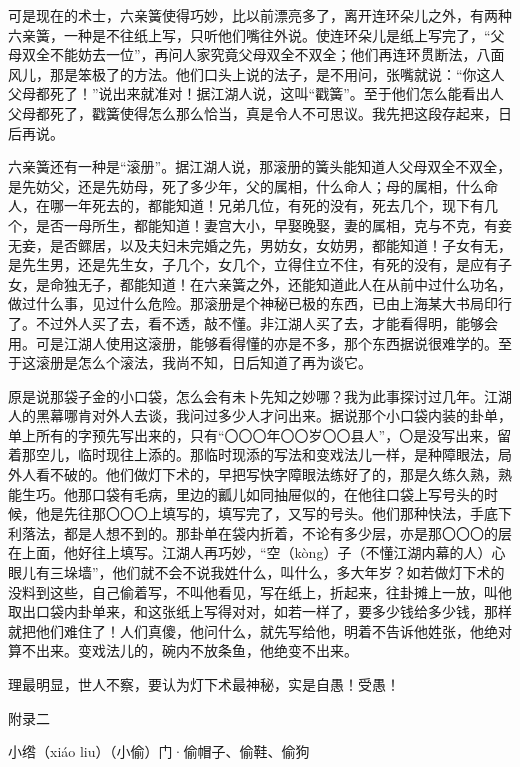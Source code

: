 \documentclass[12pt,UTF8]{ctexbook}
\begin{document}
可是现在的术士，六亲簧使得巧妙，比以前漂亮多了，离开连环朵儿之外，有两种六亲簧，一种是不往纸上写，只听他们嘴往外说。使连环朵儿是纸上写完了，“父母双全不能妨去一位”，再问人家究竟父母双全不双全；他们再连环贯断法，八面风儿，那是笨极了的方法。他们口头上说的法子，是不用问，张嘴就说：“你这人父母都死了！”说出来就准对！据江湖人说，这叫“戳簧”。至于他们怎么能看出人父母都死了，戳簧使得怎么那么恰当，真是令人不可思议。我先把这段存起来，日后再说。

六亲簧还有一种是“滚册”。据江湖人说，那滚册的簧头能知道人父母双全不双全，是先妨父，还是先妨母，死了多少年，父的属相，什么命人；母的属相，什么命人，在哪一年死去的，都能知道！兄弟几位，有死的没有，死去几个，现下有几个，是否一母所生，都能知道！妻宫大小，早娶晚娶，妻的属相，克与不克，有妾无妾，是否鳏居，以及夫妇未完婚之先，男妨女，女妨男，都能知道！子女有无，是先生男，还是先生女，子几个，女几个，立得住立不住，有死的没有，是应有子女，是命独无子，都能知道！在六亲簧之外，还能知道此人在从前中过什么功名，做过什么事，见过什么危险。那滚册是个神秘已极的东西，已由上海某大书局印行了。不过外人买了去，看不透，敲不懂。非江湖人买了去，才能看得明，能够会用。可是江湖人使用这滚册，能够看得懂的亦是不多，那个东西据说很难学的。至于这滚册是怎么个滚法，我尚不知，日后知道了再为谈它。

原是说那袋子金的小口袋，怎么会有未卜先知之妙哪？我为此事探讨过几年。江湖人的黑幕哪肯对外人去谈，我问过多少人才问出来。据说那个小口袋内装的卦单，单上所有的字预先写出来的，只有“〇〇〇年〇〇岁〇〇县人”，〇是没写出来，留着那空儿，临时现往上添的。那临时现添的写法和变戏法儿一样，是种障眼法，局外人看不破的。他们做灯下术的，早把写快字障眼法练好了的，那是久练久熟，熟能生巧。他那口袋有毛病，里边的瓤儿如同抽屉似的，在他往口袋上写号头的时候，他是先往那〇〇〇上填写的，填写完了，又写的号头。他们那种快法，手底下利落法，都是人想不到的。那卦单在袋内折着，不论有多少层，亦是那〇〇〇的层在上面，他好往上填写。江湖人再巧妙，“空（kòng）子（不懂江湖内幕的人）心眼儿有三垛墙”，他们就不会不说我姓什么，叫什么，多大年岁？如若做灯下术的没料到这些，自己偷着写，不叫他看见，写在纸上，折起来，往卦摊上一放，叫他取出口袋内卦单来，和这张纸上写得对对，如若一样了，要多少钱给多少钱，那样就把他们难住了！人们真傻，他问什么，就先写给他，明着不告诉他姓张，他绝对算不出来。变戏法儿的，碗内不放条鱼，他绝变不出来。

理最明显，世人不察，要认为灯下术最神秘，实是自愚！受愚！





附录二


小绺（xiáo liu）（小偷）门·偷帽子、偷鞋、偷狗
\end{document}
